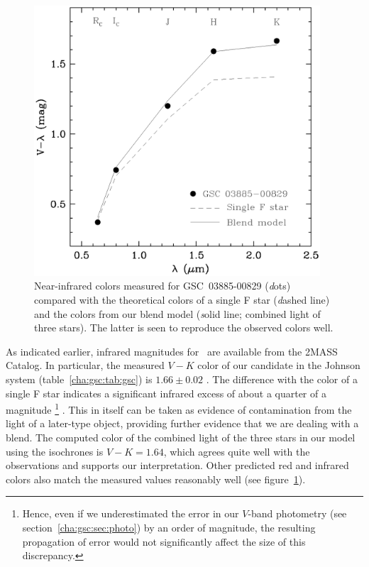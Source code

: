 \begin{figure}
\begin{center}
\includegraphics[width=0.95\textwidth]{3_f7}
\caption[Near-infrared colors for \mbox{GSC 03885-00829} and an F star]{Near-infrared colors measured for \mbox{GSC 03885-00829}
  ({\textit dots}) compared with the theoretical colors of a single F star
  ({\textit dashed line}) and the colors from our blend model ({\textit solid line};
  combined light of three stars). The latter is seen to reproduce the
  observed colors well.}\label{cha:gsc:fig:colors}
\end{center}
\end{figure}

As indicated earlier, infrared magnitudes for \gscOTE\ are
available from the 2MASS Catalog.  In particular, the measured $V-K$
color of our candidate in the Johnson system (table~\ref{cha:gsc:tab:gsc}) is
$1.66 \pm 0.02$
\citep[using transformations from the 2MASS system
by][]{Carpenter:aj:2001a}. The difference with the color of a single F star
indicates a significant infrared excess of about a quarter of a
magnitude%
\footnote{Hence, even if we underestimated the error in our $V$-band
  photometry (see section~\ref{cha:gsc:sec:photo}) by an order of magnitude, the
  resulting propagation of error would not significantly affect the
  size of this discrepancy.}%
. This in itself can be taken as evidence of contamination
from the light of a later-type object, providing further evidence that
we are dealing with a blend. The computed color of the combined light
of the three stars in our model using the
 \citet{Baraffe_Chabrier_Allard:aa:1998a} isochrones
is $V-K = 1.64$, which agrees quite well with the observations and
supports our interpretation. Other predicted red and infrared colors
also match the measured values reasonably well (see figure~\ref{cha:gsc:fig:colors}).

